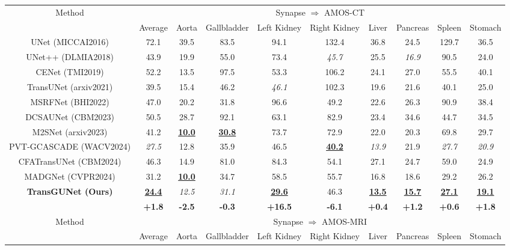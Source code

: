 \begin{table*}
\begin{tabular}{c|c|cccccccc}
    \hline
    \multicolumn{1}{c|}{\multirow{2}{*}{Method}} & \multicolumn{9}{c}{Synapse $\Rightarrow$ AMOS-CT} \\ \cline{2-10}
     & Average & Aorta & Gallbladder & Left Kidney & Right Kidney & Liver & Pancreas & Spleen & Stomach \\
    \hline
    UNet \tiny{(MICCAI2016)}     & 72.1 & 39.5 & 83.5 & 94.1 & 132.4 & 36.8 & 24.5 & 129.7 & 36.5 \\
    UNet++ \tiny{(DLMIA2018)}    & 43.9 & 19.9 & 55.0 & 73.4 & \textit{45.7} & 25.5 & \textit{16.9} & 90.5 & 24.0 \\
    CENet \tiny{(TMI2019)}       & 52.2 & 13.5 & 97.5 & 53.3 & 106.2 & 24.1 & 27.0 & 55.5 & 40.1 \\
    TransUNet \tiny{(arxiv2021)} & 39.5 & 15.4 & 46.2 & \textit{46.1} & 102.3 & 19.6 & 21.6 & 40.1 & 25.0 \\
    MSRFNet \tiny{(BHI2022)}     & 47.0 & 20.2 & 31.8 & 96.6 & 49.2 & 22.6 & 26.3 & 90.9 & 38.4 \\
    DCSAUNet \tiny{(CBM2023)}    & 50.5 & 28.7 & 92.1 & 63.1 & 82.9 & 23.4 & 34.6 & 44.7 & 34.5 \\
    M2SNet \tiny{(arxiv2023)}    & 41.2 & \textbf{\underline{10.0}} & \textbf{\underline{30.8}} & 73.7 & 72.9 & 22.0 & 20.3 & 69.8 & 29.7 \\
    PVT-GCASCADE \tiny{(WACV2024)} & \textit{27.5} & 12.8 & 35.9 & 46.5 & \textbf{\underline{40.2}} & \textit{13.9} & 21.9 & \textit{27.7} & \textit{20.9} \\
    CFATransUNet \tiny{(CBM2024)} & 46.3 & 14.9 & 81.0 & 84.3 & 54.1 & 27.1 & 24.7 & 59.0 & 24.9 \\
    MADGNet \tiny{(CVPR2024)}    & 31.2 & \textbf{\underline{10.0}} & 34.7 & 58.5 & 55.7 & 16.8 & 18.6 & 29.2 & 26.2 \\
    \hline
    \multicolumn{1}{c|}{\multirow{2}{*}{\textbf{TransGUNet \tiny{(Ours)}}}} & \textbf{\underline{24.4}} & \textit{12.5} & \textit{31.1} & \textbf{\underline{29.6}} & 46.3 & \textbf{\underline{13.5}} & \textbf{\underline{15.7}} & \textbf{\underline{27.1}} & \textbf{\underline{19.1}} \\ \cline{2-10}
    & \textbf{+1.8} & \textbf{-2.5} & \textbf{-0.3} & \textbf{+16.5} & \textbf{-6.1} & \textbf{+0.4} & \textbf{+1.2} & \textbf{+0.6} & \textbf{+1.8} \\
    \hline
    \multicolumn{1}{c|}{\multirow{2}{*}{Method}} & \multicolumn{9}{c}{Synapse $\Rightarrow$ AMOS-MRI} \\ \cline{2-10}
     & Average & Aorta & Gallbladder & Left Kidney & Right Kidney & Liver & Pancreas & Spleen & Stomach \\

\end{tabular}
\end{table*}
